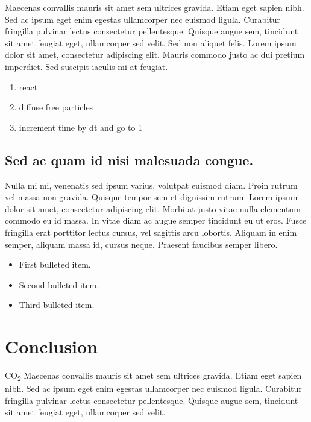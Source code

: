 \documentclass[10pt,letterpaper]{article}
\begin{document}
Maecenas convallis mauris sit amet sem ultrices gravida. Etiam eget sapien nibh. Sed ac ipsum eget enim egestas ullamcorper nec euismod ligula. Curabitur fringilla pulvinar lectus consectetur pellentesque. Quisque augue sem, tincidunt sit amet feugiat eget, ullamcorper sed velit. Sed non aliquet felis. Lorem ipsum dolor sit amet, consectetur adipiscing elit. Mauris commodo justo ac dui pretium imperdiet. Sed suscipit iaculis mi at feugiat. 

\begin{enumerate}
	\item{react}
	\item{diffuse free particles}
	\item{increment time by dt and go to 1}
\end{enumerate}

\subsection*{Sed ac quam id nisi malesuada congue.}

Nulla mi mi, venenatis sed ipsum varius, volutpat euismod diam. Proin rutrum vel massa non gravida. Quisque tempor sem et dignissim rutrum. Lorem ipsum dolor sit amet, consectetur adipiscing elit. Morbi at justo vitae nulla elementum commodo eu id massa. In vitae diam ac augue semper tincidunt eu ut eros. Fusce fringilla erat porttitor lectus cursus, vel sagittis arcu lobortis. Aliquam in enim semper, aliquam massa id, cursus neque. Praesent faucibus semper libero.

\begin{itemize}
	\item First bulleted item.
	\item Second bulleted item.
	\item Third bulleted item.
\end{itemize}



\section*{Conclusion}

CO\textsubscript{2} Maecenas convallis mauris sit amet sem ultrices gravida. Etiam eget sapien nibh. Sed ac ipsum eget enim egestas ullamcorper nec euismod ligula. Curabitur fringilla pulvinar lectus consectetur pellentesque. Quisque augue sem, tincidunt sit amet feugiat eget, ullamcorper sed velit. 
\end{document}
